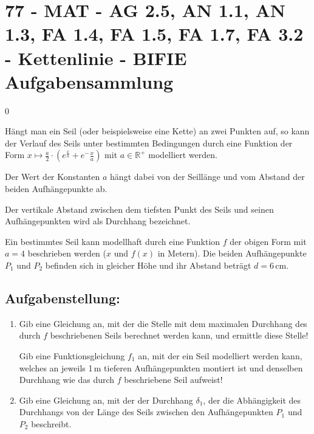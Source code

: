 \section{77 - MAT - AG 2.5, AN 1.1, AN 1.3, FA 1.4, FA 1.5, FA 1.7, FA 3.2 - Kettenlinie - BIFIE Aufgabensammlung}

\begin{langesbeispiel} \item[0] %
	
Hängt man ein Seil (oder beispielsweise eine Kette) an zwei Punkten auf, so kann der Verlauf des Seils unter bestimmten Bedingungen durch eine Funktion der Form $x\mapsto \frac{a}{2}\cdot\left(e^\frac{x}{a}+e^-\frac{x}{a}\right)$ mit $a\in\mathbb{R}^+$ modelliert werden.

Der Wert der Konstanten $a$ hängt dabei von der Seillänge und vom Abstand der beiden Aufhängepunkte ab.

Der vertikale Abstand zwischen dem tiefsten Punkt des Seils und seinen Aufhängepunkten wird als Durchhang bezeichnet.

Ein bestimmtes Seil kann modellhaft durch eine Funktion $f$ der obigen Form mit $a=4$ beschrieben werden ($x$ und $f(x)$ in Metern). Die beiden Aufhängepunkte $P_1$ und $P_2$ befinden sich in gleicher Höhe und ihr Abstand beträgt $d=6$\,cm.

\subsection{Aufgabenstellung:}
\begin{enumerate}
	\item Gib eine Gleichung an, mit der die Stelle mit dem maximalen Durchhang des durch $f$ beschriebenen Seils berechnet werden kann, und ermittle diese Stelle!\leer
	
	Gib eine Funktionsgleichung $f_1$ an, mit der ein Seil modelliert werden kann, welches an jeweils 1\,m tieferen Aufhängepunkten montiert ist und denselben Durchhang wie das durch $f$ beschriebene Seil aufweist!\leer
	
	\item Gib eine Gleichung an, mit der der Durchhang $\delta_1$, der die Abhängigkeit des Durchhangs von der Länge des Seils zwischen den Aufhängepunkten $P_1$ und $P_2$ beschreibt.
	
\begin{center}
\end{center}
	

\end{enumerate}
\end{langesbeispiel}
